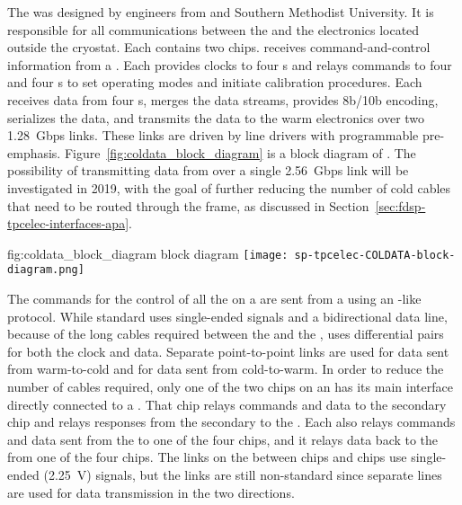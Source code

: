 The   was designed by engineers from  
and Southern Methodist University. It is responsible for all communications 
between the  and the electronics located outside the cryostat. 
Each  contains two  chips.  receives 
command-and-control information from a . Each  provides 
clocks to four s and relays commands to four  
  and four s to set operating modes and 
initiate calibration procedures.  Each  receives data from four 
s, merges the data streams, provides 8b/10b encoding, serializes 
the data, and transmits the data to the warm electronics over two \SI{1.28}{Gbps} 
links.  These links are driven by line drivers with programmable pre-emphasis. 
Figure~\ref{fig:coldata_block_diagram} is a block diagram of . 
The possibility of transmitting data from  over a single 
\SI{2.56}{Gbps} link will be investigated in 2019, with the goal of further
reducing the number of cold cables that need to be routed through the
 frame, as discussed in Section~\ref{sec:fdsp-tpcelec-interfaces-apa}.

\begin{dunefigure}
{fig:coldata_block_diagram}
{ block diagram}
\texttt{[image: sp-tpcelec-COLDATA-block-diagram.png]}
\end{dunefigure}

The commands for the control of all the  on a  are sent 
from a   
using an -like~\cite{bib:I2C} protocol. While standard 
 uses single-ended  signals and a bidirectional data 
line, because of the long cables required between the  and the 
,  uses  differential pairs for both 
the  clock and data. Separate point-to-point links are used for
data sent from warm-to-cold and for data sent from cold-to-warm.
In order to reduce the number of cables required, only one of the two 
 chips on an  has its main  interface 
directly connected to a . That  chip relays  
commands and data to the secondary  chip and relays  
responses from the secondary  to the . 
Each   also relays  commands and data sent from the 
 to one of the four  chips, and it relays data back to
the  from one of the  four  chips. 
The links on the  between  
chips and  chips use single-ended (\SI{2.25}{V})  
signals, but the  links are still non-standard since separate lines are
used for data transmission in the two directions.

